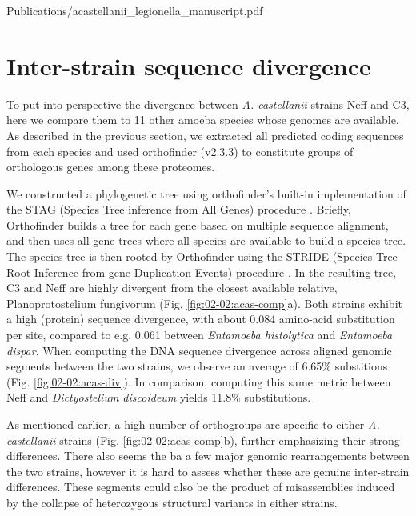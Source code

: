 
     {Publications/acastellanii_legionella_manuscript.pdf}    


\section{Inter-strain sequence divergence}

To put into perspective the divergence between \textit{A. castellanii} strains Neff and C3, here we compare them to 11 other amoeba species whose genomes are available. As described in the previous section, we extracted all predicted coding sequences from each species and used orthofinder (v2.3.3) to constitute groups of orthologous genes among these proteomes.

We constructed a phylogenetic tree using orthofinder's built-in implementation of the STAG (Species Tree inference from All Genes) procedure \cite{emmsSTAGSpeciesTree2018}. Briefly, Orthofinder builds a tree for each gene based on multiple sequence alignment, and then uses all gene trees where all species are available to build a species tree. The species tree is then rooted by Orthofinder using the STRIDE (Species Tree Root Inference from gene Duplication Events) procedure \cite{emmsSTRIDESpeciesTree2017}. In the resulting tree, C3 and Neff are highly divergent from the closest available relative, Planoprotostelium fungivorum (Fig. \ref{fig:02-02:acas-comp}a). Both strains exhibit a high (protein) sequence divergence, with about 0.084 amino-acid substitution per site, compared to e.g. 0.061 between \textit{Entamoeba histolytica} and \textit{Entamoeba dispar}. When computing the DNA sequence divergence across aligned genomic segments between the two strains, we observe an average of 6.65\% substitions (Fig. \ref{fig:02-02:acas-div}). In comparison, computing this same metric between Neff and \textit{Dictyostelium discoideum} yields 11.8\% substitutions.

As mentioned earlier, a high number of orthogroups are specific to either \textit{A. castellanii} strains (Fig. \ref{fig:02-02:acas-comp}b), further emphasizing their strong differences. There also seems the ba a few major genomic rearrangements between the two strains, however it is hard to assess whether these are genuine inter-strain differences. These segments could also be the product of misassemblies induced by the collapse of heterozygous structural variants in either strains.



